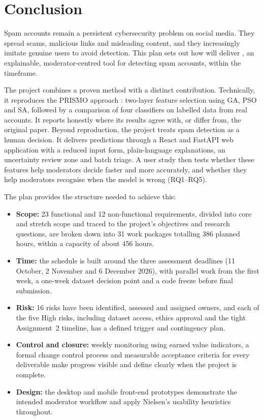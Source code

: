 \section{Conclusion}\label{sec:conclusion}

Spam accounts remain a persistent cybersecurity problem on social media. They spread scams, malicious links and misleading content, and they increasingly imitate genuine users to avoid detection. This plan sets out how \teamname{} will deliver \projectname{}, an explainable, moderator-centred tool for detecting spam accounts, within the \unitcode{} timeframe.

The project combines a proven method with a distinct contribution. Technically, it reproduces the PRISMO approach \parencite{agrawal2018prismo}: two-layer feature selection using GA, PSO and SA, followed by a comparison of four classifiers on labelled data from real accounts. It reports honestly where its results agree with, or differ from, the original paper. Beyond reproduction, the project treats spam detection as a human decision. It delivers predictions through a React and FastAPI web application with a reduced input form, plain-language explanations, an uncertainty review zone and batch triage. A user study then tests whether these features help moderators decide faster and more accurately, and whether they help moderators recognise when the model is wrong (RQ1--RQ5).

The plan provides the structure needed to achieve this:

\begin{itemize}[nosep]
  \item \textbf{Scope:} 23 functional and 12 non-functional requirements, divided into core and stretch scope and traced to the project's objectives and research questions, are broken down into 31 work packages totalling 386 planned hours, within a capacity of about 456 hours.
  \item \textbf{Time:} the schedule is built around the three assessment deadlines (11 October, 2 November and 6 December 2026), with parallel work from the first week, a one-week dataset decision point and a code freeze before final submission.
  \item \textbf{Risk:} 16 risks have been identified, assessed and assigned owners, and each of the five High risks, including dataset access, ethics approval and the tight Assignment~2 timeline, has a defined trigger and contingency plan.
  \item \textbf{Control and closure:} weekly monitoring using earned value indicators, a formal change control process and measurable acceptance criteria for every deliverable make progress visible and define clearly when the project is complete.
  \item \textbf{Design:} the desktop and mobile front-end prototypes demonstrate the intended moderator workflow and apply Nielsen's usability heuristics \parencite{nielsen1994heuristics} throughout.
\end{itemize}

